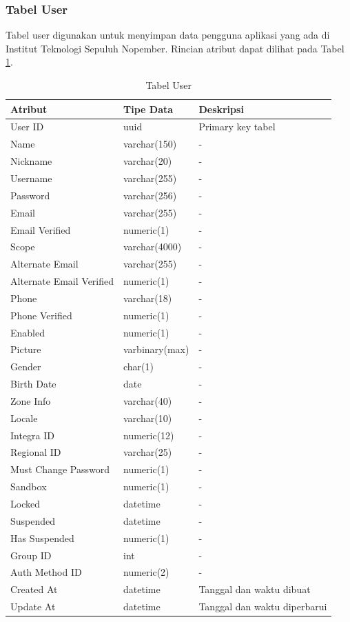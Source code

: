 \subsubsection{Tabel User}
\par Tabel user digunakan untuk menyimpan data pengguna aplikasi yang ada di Institut Teknologi Sepuluh Nopember. Rincian atribut dapat dilihat pada Tabel \ref{tabel_user}.
\begin{longtable}{|p{2cm}|p{2.5cm}|p{4.5cm}|}
 	\caption{Tabel User} \label{tabel_user} \\ \hline
    \textbf{Atribut} & \textbf{Tipe Data} & \textbf{Deskripsi} \\ \hline
    User ID & uuid & Primary key tabel \\ \hline
    Name & varchar(150) & - \\ \hline
    Nickname & varchar(20) & - \\ \hline
    Username & varchar(255) & - \\ \hline
    Password & varchar(256) & - \\ \hline
    Email & varchar(255) & - \\ \hline
    Email Verified & numeric(1) & - \\ \hline
    Scope & varchar(4000) & - \\ \hline
    Alternate Email & varchar(255) & - \\ \hline
    Alternate Email Verified & numeric(1) & - \\ \hline
    Phone & varchar(18) & - \\ \hline
    Phone Verified & numeric(1) & - \\ \hline
    Enabled & numeric(1) & - \\ \hline
    Picture & varbinary(max) & - \\ \hline
    Gender & char(1) & - \\ \hline
    Birth Date & date & - \\ \hline
    Zone Info & varchar(40) & - \\ \hline
    Locale & varchar(10) & - \\ \hline
    Integra ID & numeric(12) & - \\ \hline
    Regional ID & varchar(25) & - \\ \hline
    Must Change Password & numeric(1) & - \\ \hline
    Sandbox & numeric(1) & - \\ \hline
    Locked & datetime & - \\ \hline
    Suspended & datetime & - \\ \hline
    Has Suspended & numeric(1) & - \\ \hline
    Group ID & int & - \\ \hline
    Auth Method ID & numeric(2) & - \\ \hline
    Created At & datetime & Tanggal dan waktu dibuat \\ \hline
    Update At & datetime & Tanggal dan waktu diperbarui \\ \hline
\end{longtable}

